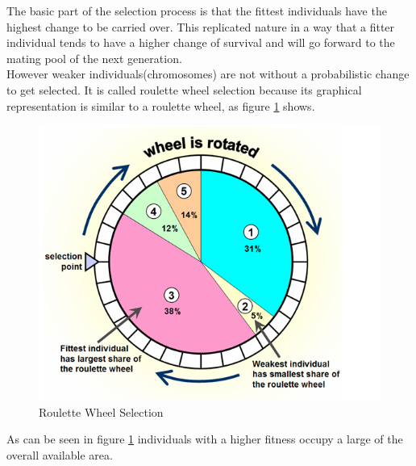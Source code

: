 The basic part of the selection process is that the fittest individuals have the highest change to be carried over. This replicated nature in a way that a fitter individual tends to have a higher change of survival and will go forward to the mating pool of the next generation.\\
However weaker individuals(chromosomes) are not without a probabilistic change to get selected. 
It is called roulette wheel selection because its graphical representation is similar to a roulette wheel, as figure \ref{fig:selection} shows\cite{1631619}.

\begin{figure}[h]
\begin{center}
\includegraphics[scale=0.4]{Chapter1/images/roulette_wheel.png} 
\caption[Roulette Wheel Selection]{Roulette Wheel Selection\footnotemark}
\label{fig:selection}
\end{center}
\end{figure} 


As can be seen in figure \ref{fig:selection} individuals with a higher fitness occupy a large of the overall available area. \\

